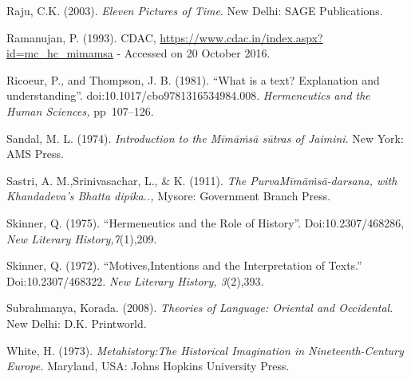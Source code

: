 \begin{thebibliography}{99}
  Raju, C.K. (2003). \textit{Eleven Pictures of Time}. New Delhi: SAGE Publications.

  Ramanujan, P. (1993). CDAC, \url{https://www.cdac.in/index.aspx?id=mc_hc_mimamsa} - Accessed on 20 October 2016.

  Ricoeur, P., and Thompson, J. B. (1981). “What is a text? Explanation and understanding”. doi:10.1017/cbo9781316534984.008. \textit{Hermeneutics and the Human Sciences,} pp~107--126.

  Sandal, M. L. (1974). \textit{Introduction to the Mīmāṁsā sūtras of Jaimini}. New York: AMS Press.

  Sastri, A. M.,Srinivasachar, L., \& K. (1911). \textit{The PurvaMīmāṁsā-darsana, with Khandadeva's Bhatta dipika..,} Mysore: Government Branch Press.

  Skinner, Q. (1975). “Hermeneutics and the Role of History”. Doi:10.2307/468286, \textit{New Literary History,7}(1),209.

  Skinner, Q. (1972). “Motives,Intentions and the Interpretation of Texts.” Doi:10.2307/468322. \textit{New Literary History, 3}(2),393.

  Subrahmanya, Korada. (2008). \textit{Theories of Language: Oriental and Occidental}. New Delhi: D.K. Printworld.

  White, H. (1973). \textit{Metahistory:The Historical Imagination in Nineteenth-Century Europe.} Maryland, USA: Johns Hopkins University Press.

 \end{thebibliography}

\theendnotes

